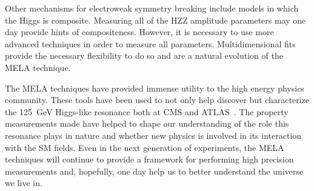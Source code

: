 Other mechanisms for electroweak symmetry breaking include 
models in which the Higgs is composite.  Measuring all of
the HZZ amplitude parameters may one day provide
hints of compositeness.  However, it is necessary to use 
more advanced techniques in order to measure all parameters.
Multidimensional fits provide the necessary flexibility to do
so and are a natural evolution of the MELA technique.
  
The MELA techniques have provided immense utility
to the high energy physics community.  These tools have been used 
to not only help discover but characterize the 125~GeV Higgs-like
resonance both at CMS and ATLAS~\cite{ATLAS:2013nma}.  The property
measurements made have helped to shape our understanding of the
role this resonance plays in nature and whether new physics is
involved in its interaction with the SM fields.  Even in the next 
generation of experiments, the MELA techniques will
continue to provide a framework for performing high precision
measurements and, hopefully, one day help us to better understand
the universe we live in.



